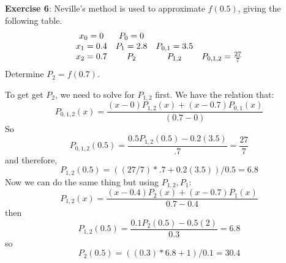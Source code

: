 \documentclass{article}
\begin{document}
\textbf{Exercise 6}: Neville's method is used to approximate $f(0.5)$, giving the following table.
    \begin{align*}
        \begin{array}{ c c c c }
            x_{0} = 0   & P_{0} = 0   &                &                             \\
            x_{1} = 0.4 & P_{1} = 2.8 & P_{0, 1} = 3.5 &                             \\
            x_{2} = 0.7 & P_{2}       & P_{1, 2}       & P_{0, 1, 2} = \frac{27}{7}   
        \end{array}
    \end{align*}
Determine $P_{2} = f(0.7)$.
    \begin{answer}
        To get get $P_{2}$, we need to solve for $P_{1, 2}$ first. We have the relation that:
            \begin{equation*}
                P_{0, 1, 2}(x) = \dfrac{(x - 0)P_{1, 2}(x) + (x - 0.7)P_{0, 1}(x)}{(0.7 - 0)}
            \end{equation*}
        So
            \begin{equation*}
                P_{0, 1, 2}(0.5) = \dfrac{0.5P_{1, 2}(0.5) -0.2(3.5)}{.7} = \dfrac{27}{7}
            \end{equation*}
        and therefore,
            \begin{equation*}
                P_{1, 2}(0.5) = ((27 / 7) * .7 + 0.2(3.5)) / 0.5 = 6.8
            \end{equation*}
        Now we can do the same thing but using $P_{1, 2}, P_{1}$:
            \begin{equation*}
                P_{1, 2}(x) = \dfrac{(x - 0.4)P_{2}(x) + (x - 0.7)P_{1}(x)}{0.7 - 0.4}
            \end{equation*}
        then
            \begin{equation*}
                P_{1, 2}(0.5) = \dfrac{0.1P_{2}(0.5) - 0.5(2)}{0.3} = 6.8
            \end{equation*}
        so
            \begin{equation*}
                P_{2}(0.5) = ((0.3) * 6.8 + 1) / 0.1 = 30.4
            \end{equation*}
    \end{answer}
\end{document}
